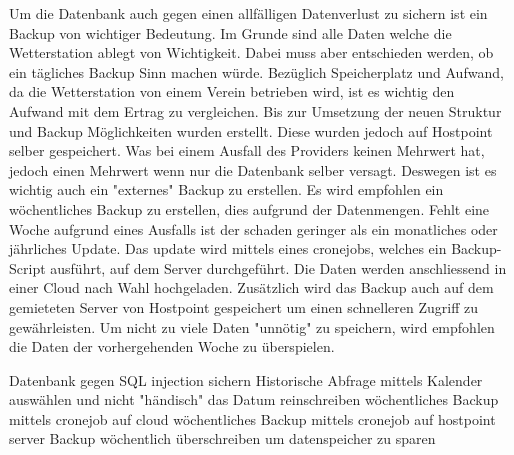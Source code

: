 Um die Datenbank auch gegen einen allfälligen Datenverlust zu sichern ist ein Backup von wichtiger Bedeutung. Im Grunde sind alle Daten welche die Wetterstation ablegt von Wichtigkeit. Dabei muss aber entschieden werden, ob ein tägliches Backup Sinn machen würde. Bezüglich Speicherplatz und Aufwand, da die Wetterstation von einem Verein betrieben wird, ist es wichtig den Aufwand mit dem Ertrag zu vergleichen. Bis zur  Umsetzung der neuen Struktur und Backup Möglichkeiten wurden  erstellt. Diese wurden jedoch auf Hostpoint selber gespeichert. Was bei einem Ausfall des Providers keinen Mehrwert hat, jedoch einen Mehrwert wenn nur die Datenbank selber versagt. Deswegen ist es wichtig auch ein "externes" Backup zu erstellen. Es wird empfohlen ein wöchentliches Backup zu erstellen, dies aufgrund der Datenmengen. Fehlt eine Woche aufgrund eines Ausfalls ist der schaden geringer als ein monatliches oder jährliches Update. Das update wird mittels eines cronejobs, welches ein Backup-Script ausführt, auf dem Server durchgeführt. Die Daten werden anschliessend in einer Cloud nach Wahl hochgeladen. Zusätzlich wird das Backup auch auf dem gemieteten Server von Hostpoint gespeichert um einen schnelleren Zugriff zu gewährleisten. Um nicht zu viele Daten "unnötig" zu speichern, wird empfohlen die Daten der vorhergehenden Woche zu überspielen. 


Datenbank gegen SQL injection sichern
Historische Abfrage mittels Kalender auswählen und nicht "händisch" das Datum reinschreiben
wöchentliches Backup mittels cronejob auf cloud
wöchentliches Backup mittels cronejob auf hostpoint server
Backup wöchentlich überschreiben um datenspeicher zu sparen
   


